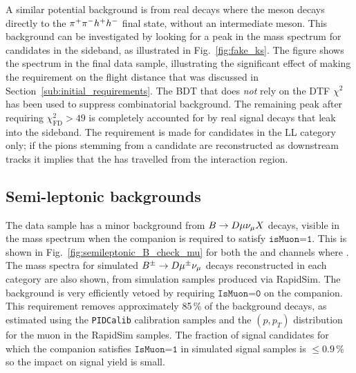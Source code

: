 A similar potential background is from real \BtoDh decays where the \D meson decays directly to the ${{\pi}^+}{{\pi}^-} h^+ h^-$ final state, without an intermediate \KS meson. This background can be investigated by looking for a peak in the \B mass spectrum for candidates in the \KS sideband, as illustrated in Fig.~\ref{fig:fake_ks}. The figure shows the spectrum in the final data sample, illustrating the significant effect of making the requirement on the \KS flight distance that was discussed in Section~\ref{sub:initial_requirements}. The BDT that does \emph{not} rely on the DTF $\chi^2$ has been used to suppress combinatorial background. The remaining peak after requiring $\chi^2_\text{FD}>49$ is completely accounted for by real signal decays that leak into the \KS sideband. The requirement is made for candidates in the LL category only; if the pions stemming from a \KS candidate are reconstructed as downstream tracks it implies that the \KS has travelled from the interaction region.


\subsection{Semi-leptonic backgrounds} %
\label{sub:semi_leptonic_backgrounds}



The data sample has a minor background from ${B}\rightarrow{\ensuremath{D}}\mu\nu_\mu X$ decays, visible in the \B mass spectrum when the companion is required to satisfy $\texttt{isMuon=1}$.  This is shown in Fig.~\ref{fig:semileptonic_B_check_mu} for both the \BtoDK and \BtoDpi channels where \DtoKspipi. The \B mass spectra for simulated ${{B}^\pm}\rightarrow{\ensuremath{D}}{\ensuremath{\mu^\pm}}\nu_\mu$ decays reconstructed in each category are also shown, from simulation samples produced via RapidSim. The background is very efficiently vetoed by requiring $\texttt{IsMuon=0}$ on the companion. This requirement removes approximately 85\,\% of the background decays, as estimated using the \texttt{PIDCalib} calibration samples and the $(p, p_T)$ distribution for the muon in the RapidSim samples. The fraction of signal candidates for which the companion satisfies $\texttt{IsMuon=1}$ in simulated signal samples is $\leq 0.9\,\%$ so the impact on signal yield is small.

